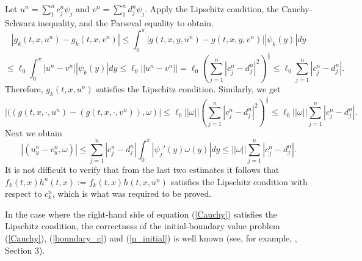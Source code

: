 \documentclass[12pt]{amsart}
\theoremstyle{definition}
\numberwithin{equation}{section}
\begin{document}
    Let $u^n = \sum_1^n c_j^n \psi_j$ and $v^n = \sum_1^n d_j^n \psi_j$. Apply the Lipschitz condition, the Cauchy-Schwarz inequality, and the Parseval equality to obtain.
    \[
    |g_k(t, x, u^n) - g_k(t, x, v^n)| \leq \int_0^\pi |g(t, x, y, u^n) - g(t, x, y, v^n)| |\psi_k(y)| dy
    \]
   \[
  \leq \ell_0 \int_0^\pi |u^n -v^n||\psi_k(y)| dy \leq \ell_0 ||u^n -v^n|| = \ell_0 \left( \sum_{j=1}^n |c_j^n - d_j^n|^2\right)^{\frac{1}{2}}\leq \ell_0 \sum_{j=1}^n |c_j^n - d_j^n|.
   \]
   Therefore, $g_k(t, x, u^n)$ satisfies the Lipschitz condition. Similarly, we get
   \[
  |( (g(t, x, \cdot, u^n) - (g(t, x, \cdot, v^n)), \omega)|\leq \ell_0 ||\omega|| \left( \sum_{j=1}^n |c_j^n - d_j^n|^2\right)^{\frac{1}{2}}\leq \ell_0 ||\omega||\sum_{j=1}^n |c_j^n - d_j^n|.
   \]
   Next we obtain
   \[
   |( u_y^n - v_y^n , \omega)|\leq \sum_{j=1}^n |c_j^n - d_j^n| \int_0^\pi |\psi_j'(y) \omega(y)| dy \leq ||\omega||\sum_{j=1}^n |c_j^n - d_j^n|.
   \]
   It is not difficult to verify that from the last two estimates it follows that $f_k (t, x) h^n (t, x):=  f_k (t, x) h(t, x, u^n)$ satisfies the Lipschitz condition with respect to $c_k^n$, which is what was required to be proved.

   In the case where the right-hand side of equation (\ref{Cauchy}) satisfies the Lipschitz condition, the correctness of the initial-boundary value problem (\ref{Cauchy}), (\ref{boundary_c}) and (\ref{n_initial}) is well known (see, for example, \cite{Gal}, Section 3).
   
\end{document}
